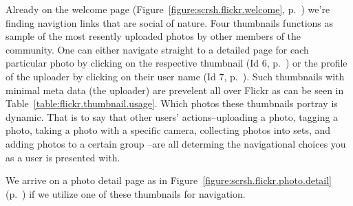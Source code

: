 
Already on the welcome page (Figure~\ref{figure:scrsh.flickr.welcome},
p.~\pageref{figure:scrsh.flickr.welcome})
we're finding navigtion links that are social of
nature. Four thumbnails functions as sample of the most resently uploaded
photos by other members of the community. One can either navigate straight to
a detailed page for each particular photo by clicking on the respective
thumbnail (Id 6, p.~\pageref{table:flickr.content.inventory.6})
or the profile of the uploader by clicking on their user
name (Id 7, p.~\pageref{table:flickr.content.inventory.7}). Such thumbnails
with minimal meta data (the uploader) are prevelent all over Flickr as can be
seen in
Table~\ref{table:flickr.thumbnail.usage}.
Which photos these thumbnails portray is dynamic. That is to say that other
users' actions--uploading a photo, tagging a photo, taking a photo with a
specific camera, collecting photos into sets, and adding photos to a certain
group --are all determing the navigational choices you as a user is
presented with.

We arrive on a photo detail page as in
Figure~\ref{figure:scrsh.flickr.photo.detail}
(p.~\pageref{figure:scrsh.flickr.photo.detail})
if we utilize one of these thumbnails for navigation.


